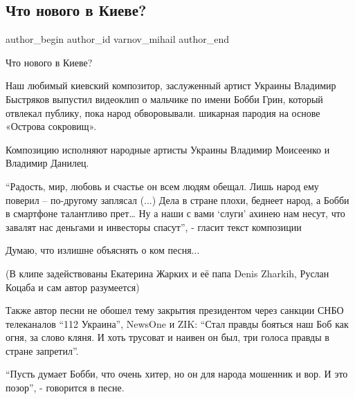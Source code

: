  
 
 
 
 
 
\subsection{Что нового в Киеве?}
\label{sec:30_05_2021.fb.varnov_mihail.1.malchik_bobbi_kiev_klip}
\ifcmt
 author_begin
   author_id varnov_mihail
 author_end
\fi

Что нового в Киеве? 

Наш любимый киевский композитор, заслуженный артист Украины Владимир Быстряков
выпустил видеоклип о мальчике по имени Бобби Грин, который отвлекал публику,
пока народ обворовывали. шикарная пародия на основе «Острова сокровищ». 

Композицию исполняют народные артисты Украины Владимир Моисеенко и Владимир Данилец.

\enquote{Радость, мир, любовь и счастье он всем людям обещал. Лишь народ ему поверил –
по-другому заплясал (...) Дела в стране плохи, беднеет народ, а Бобби в
смартфоне талантливо прет… Ну а наши с вами \enquote{слуги} ахинею нам несут, что
завалят нас деньгами и инвесторы спасут}, - гласит текст композиции

Думаю, что излишне объяснять о ком песня...

(В клипе задействованы Екатерина Жарких и её папа Denis Zharkih, Руслан Коцаба
и сам автор разумеется)

\begin{itemize}

Также автор песни не обошел тему закрытия президентом через санкции СНБО
телеканалов \enquote{112 Украина}, NewsOne и ZIK: \enquote{Стал правды бояться наш Боб как
огня, за слово кляня. И хоть трусоват и наивен он был, три голоса правды в
стране запретил}.

\enquote{Пусть думает Бобби, что очень хитер, но он для народа мошенник и вор.
И это позор}, - говорится в песне.  
\end{itemize}
